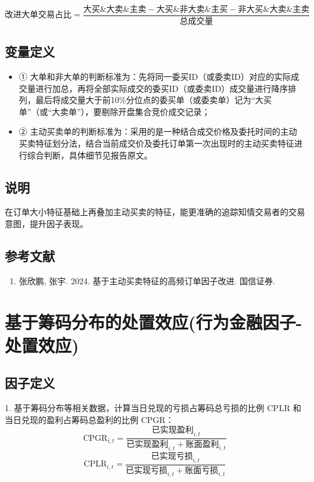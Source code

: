 \documentclass{article}
\begin{document}
\begin{equation}
    \text{改进大单交易占比} = \frac{\text{大买\&大卖\&主卖} - \text{大买\&非大卖\&主买} - \text{非大买\&大卖\&主卖}}{\text{总成交量}}
\end{equation}

\subsection{变量定义}
\begin{itemize}
    \item ① 大单和非大单的判断标准为：先将同一委买ID（或委卖ID）对应的实际成交量进行加总，再将全部实际成交的委买ID（或委卖ID）成交量进行降序排列，最后将成交量大于前10\%分位点的委买单（或委卖单）记为“大买单”（或“大卖单”），要剔除开盘集合竞价成交记录；
    \item ② 主动买卖单的判断标准为：采用的是一种结合成交价格及委托时间的主动买卖特征划分法，结合当前成交价及委托订单第一次出现时的主动买卖特征进行综合判断，具体细节见报告原文。
\end{itemize}

\subsection{说明}
在订单大小特征基础上再叠加主动买卖的特征，能更准确的追踪知情交易者的交易意图，提升因子表现。

\subsection{参考文献}
\begin{enumerate}
    \item 张欣鹏, 张宇. 2024. 基于主动买卖特征的高频订单因子改进. 国信证券.
\end{enumerate}

\section{基于筹码分布的处置效应(行为金融因子-处置效应)}

\subsection{因子定义}

1. 基于筹码分布等相关数据，计算当日兑现的亏损占筹码总亏损的比例 \( \mathrm{CPLR} \) 和当日兑现的盈利占筹码总盈利的比例 \( \mathrm{CPGR} \)：
\begin{equation}
    \mathrm{CPGR}_{i,t} = \frac{\text{已实现盈利}_{i,t}}{\text{已实现盈利}_{i,t} + \text{账面盈利}_{i,t}}
\end{equation}
\begin{equation}
    \mathrm{CPLR}_{i,t} = \frac{\text{已实现亏损}_{i,t}}{\text{已实现亏损}_{i,t} + \text{账面亏损}_{i,t}}
\end{equation}
\end{document}
